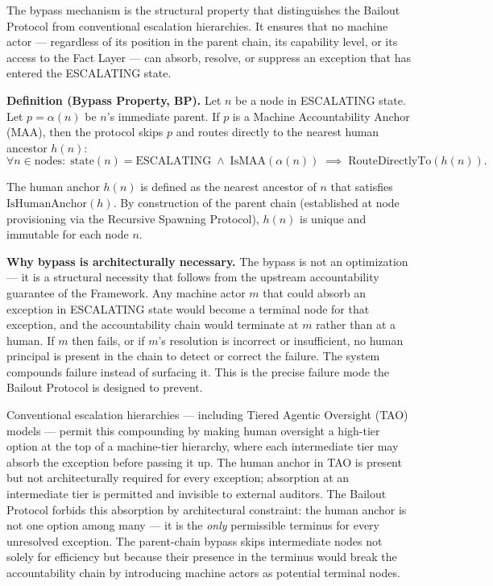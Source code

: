 The bypass mechanism is the structural property that distinguishes the Bailout Protocol from conventional escalation hierarchies. It ensures that no machine actor --- regardless of its position in the parent chain, its capability level, or its access to the Fact Layer --- can absorb, resolve, or suppress an exception that has entered the ESCALATING state.

\bigskip
\noindent\textbf{Definition (Bypass Property, BP).} Let $n$ be a node in ESCALATING state. Let $p = \alpha(n)$ be $n$'s immediate parent. If $p$ is a Machine Accountability Anchor (MAA), then the protocol skips $p$ and routes directly to the nearest human ancestor $h(n)$:
\begin{equation}
\forall n \in \text{nodes}:\; \text{state}(n) = \text{ESCALATING} \;\land\; \text{IsMAA}(\alpha(n)) \;\implies\; \text{RouteDirectlyTo}(h(n)). \tag{BP}
\end{equation}

The human anchor $h(n)$ is defined as the nearest ancestor of $n$ that satisfies $\text{IsHumanAnchor}(h)$. By construction of the parent chain (established at node provisioning via the Recursive Spawning Protocol), $h(n)$ is unique and immutable for each node $n$.

\bigskip
\noindent\textbf{Why bypass is architecturally necessary.} The bypass is not an optimization --- it is a structural necessity that follows from the upstream accountability guarantee of the \bxthree{} Framework. Any machine actor $m$ that could absorb an exception in ESCALATING state would become a terminal node for that exception, and the accountability chain would terminate at $m$ rather than at a human. If $m$ then fails, or if $m$'s resolution is incorrect or insufficient, no human principal is present in the chain to detect or correct the failure. The system compounds failure instead of surfacing it. This is the precise failure mode the Bailout Protocol is designed to prevent.

Conventional escalation hierarchies --- including Tiered Agentic Oversight (TAO) models --- permit this compounding by making human oversight a high-tier option at the top of a machine-tier hierarchy, where each intermediate tier may absorb the exception before passing it up. The human anchor in TAO is present but not architecturally required for every exception; absorption at an intermediate tier is permitted and invisible to external auditors. The Bailout Protocol forbids this absorption by architectural constraint: the human anchor is not one option among many --- it is the \emph{only} permissible terminus for every unresolved exception. The parent-chain bypass skips intermediate nodes not solely for efficiency but because their presence in the terminus would break the accountability chain by introducing machine actors as potential terminal nodes.


